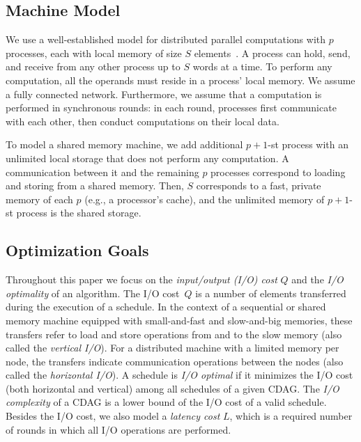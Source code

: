 \documentclass[sigplan,review,anonymous,10pt]{acmart}\settopmatter{printfolios=true,printccs=false,printacmref=false}
\newcommand\greg[1]{\textcolor{blue}{[Greg: #1]}}
\newcommand\mac[1]{\textcolor{red}{[Mac: #1]}}
\begin{document}
\subsection{Machine Model}

We use a well-established model for distributed parallel computations with $p$
processes, each with local memory of size $S$ elements~\cite{CARMA,25d}.
A process can hold, send, and receive from any other process up to $S$ words at 
a time.
To perform any computation, all the operands must reside in a process' local 
memory.
We assume a fully connected network. Furthermore, we assume that 
a computation is performed in synchronous rounds: in each round, processes 
first 
communicate with each other, then conduct computations on their local data.

To model a shared memory machine, we add additional $p+1$-st process with an 
unlimited local storage that does not perform any computation. A communication 
between it and the remaining $p$ processes correspond to loading and storing 
from a shared memory. Then, $S$ corresponds to a fast, private memory of each 
$p$ (e.g., a processor's cache), and the unlimited memory of $p+1$-st process 
is the shared storage.
%

\subsection{Optimization Goals}
%
Throughout this paper we focus on the \emph{input/output (I/O) cost} $Q$ and 
the \emph{I/O optimality} of an algorithm.
%
The 
I/O cost~$Q$ is a number of elements transferred during the execution 
of a schedule. In the context of a sequential or shared memory machine equipped 
with small-and-fast and slow-and-big memories, these transfers refer to load 
and store operations from and to the slow memory (also called the 
\emph{vertical 
I/O}). For a distributed machine with a limited memory per node, 
the 
transfers indicate communication operations between the nodes (also called the
\emph{horizontal I/O}). A schedule is \emph{I/O optimal} if it minimizes the 
I/O cost (both horizontal and vertical) among all schedules of a given CDAG. 
The 
\emph{I/O complexity} of a 
CDAG is a lower bound of the I/O cost of a valid schedule.
%
Besides the I/O cost, we also model a \emph{latency cost} $L$, which is 
a required number of rounds in 
which all I/O operations are performed.
\end{document}
